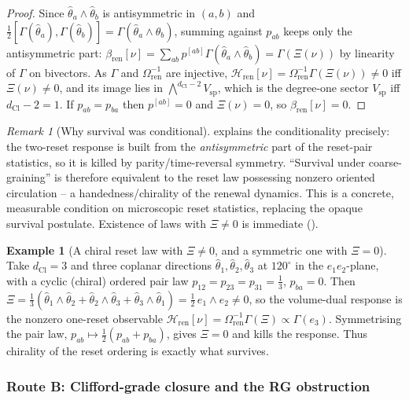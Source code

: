 \documentclass[11pt]{article}
\theoremstyle{definition}
\newtheorem{example}[theorem]{Example}
\theoremstyle{remark}
\newtheorem{remark}[theorem]{Remark}
\newcommand{\dCl}{d_{\mathrm{Cl}}}
\newcommand{\Vsp}{V_{\mathrm{sp}}}
\newcommand{\Volr}{\Omega_{\mathrm{ren}}}
\newcommand{\Hren}{\mathcal{H}_{\mathrm{ren}}}
\newcommand{\bren}{\beta_{\mathrm{ren}}}
\begin{document}
\begin{proof}
Since $\hat\theta_a\wedge\hat\theta_b$ is antisymmetric in $(a,b)$ and
$\tfrac12[\Gamma(\hat\theta_a),\Gamma(\hat\theta_b)]=\Gamma(\hat\theta_a\wedge
\hat\theta_b)$, summing against $p_{ab}$ keeps only the antisymmetric part:
$\bren[\nu]=\sum_{ab}p^{[ab]}\Gamma(\hat\theta_a\wedge\hat\theta_b)
=\Gamma(\Xi(\nu))$ by linearity of $\Gamma$ on bivectors.  As $\Gamma$ and
$\Volr^{-1}$ are injective, $\Hren[\nu]=\Volr^{-1}\Gamma(\Xi(\nu))\neq0$ iff
$\Xi(\nu)\neq0$, and its image lies in $\bigwedge^{\dCl-2}\Vsp$, which is the
degree-one sector $\Vsp$ iff $\dCl-2=1$.  If $p_{ab}=p_{ba}$ then $p^{[ab]}=0$ and
$\Xi(\nu)=0$, so $\bren[\nu]=0$.
\end{proof}

\begin{remark}[Why survival was conditional]
\label{rem:survival-meaning}
 explains the conditionality precisely:
the two-reset response is built from the \emph{antisymmetric} part of the reset-pair
statistics, so it is killed by parity/time-reversal symmetry.  ``Survival under
coarse-graining'' is therefore equivalent to the reset law possessing nonzero
oriented circulation -- a handedness/chirality of the renewal dynamics.  This is a
concrete, measurable condition on microscopic reset statistics, replacing the
opaque survival postulate.  Existence of laws with $\Xi\neq0$ is immediate
().
\end{remark}

\begin{example}[A chiral reset law with $\Xi\neq0$, and a symmetric one with $\Xi=0$]
\label{ex:chiral-law}
Take $\dCl=3$ and three coplanar directions $\hat\theta_1,
\hat\theta_2,\hat\theta_3$ at $120^\circ$ in the $e_1e_2$-plane, with a cyclic
\textup{(}chiral\textup{)} ordered pair law $p_{12}=p_{23}=p_{31}=\tfrac13$,
$p_{ba}=0$.  Then $\Xi=\tfrac13(\hat\theta_1\wedge\hat\theta_2+\hat\theta_2\wedge
\hat\theta_3+\hat\theta_3\wedge\hat\theta_1)=\tfrac12\,e_1\wedge e_2\neq0$, so the
volume-dual response is the nonzero one-reset observable $\Hren[\nu]=
\Volr^{-1}\Gamma(\Xi)\propto\Gamma(e_3)$.  Symmetrising the pair law,
$p_{ab}\mapsto\tfrac12(p_{ab}+p_{ba})$, gives $\Xi=0$ and kills the response.  Thus
chirality of the reset ordering is exactly what survives.
\end{example}

\subsubsection{Route B: Clifford-grade closure and the RG obstruction}
\end{document}
